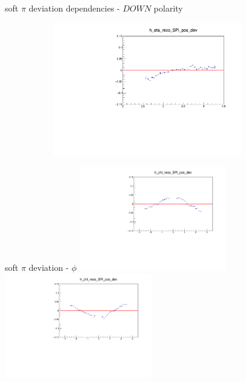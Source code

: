 \documentclass[11pt]{beamer}
\begin{document}
\begin{frame}{soft $\pi$ deviation dependencies - $DOWN$ polarity}
\begin{figure}
\begin{subfigure}{0.45\textwidth}
\end{subfigure}
\begin{subfigure}{0.45\textwidth}
\includegraphics[width=0.9\textwidth]{third/down_pdf/deviation/h_eta_reco_SPi_pos_dev.pdf}
\end{subfigure}
\end{figure}
\end{frame}
\begin{frame}{soft $\pi$ deviation - $\phi$}
\centering
\includegraphics[width=0.48\textwidth]{third/up_pdf/deviation/h_phi_reco_SPi_pos_dev.pdf}
\includegraphics[width=0.48\textwidth]{third/down_pdf/deviation/h_phi_reco_SPi_pos_dev.pdf}
\end{frame}
\end{document}
